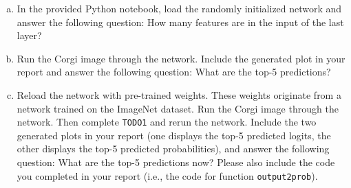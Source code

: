 \documentclass[11pt]{article}
\begin{document}
\vspace{-0.5em}
\begin{enumerate}[(a)]

\item In the provided Python notebook, load the randomly initialized network and answer the following question: How many features are in the input of the last layer?
\item Run the Corgi image through the network. Include the generated plot in your report and answer the following question: What are the top-5 predictions?
\item Reload the network with pre-trained weights. These weights originate from a network trained on the ImageNet dataset. Run the Corgi image through the network. Then complete \texttt{TODO1} and rerun the network. Include the two generated plots in your report (one displays the top-5 predicted logits, the other displays the top-5 predicted probabilities), and answer the following question: What are the top-5 predictions now? Please also include the code you completed in your report (i.e., the code for function \texttt{output2prob}).
\end{enumerate}
\end{document}
